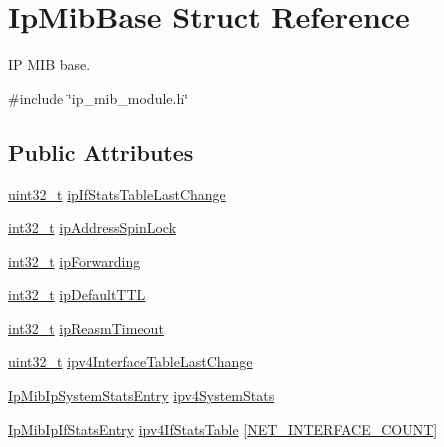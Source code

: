 \hypertarget{structIpMibBase}{}\section{Ip\+Mib\+Base Struct Reference}
\label{structIpMibBase}


IP M\+IB base.  




{\ttfamily \#include \char`\"{}ip\+\_\+mib\+\_\+module.\+h\char`\"{}}

\subsection*{Public Attributes}
\begin{DoxyCompactItemize}
\item 
\hyperlink{stdint_8h_a435d1572bf3f880d55459d9805097f62}{uint32\+\_\+t} \hyperlink{structIpMibBase_a8cdd6b8806367452ed88c4ff7fddc8fe}{ip\+If\+Stats\+Table\+Last\+Change}
\item 
\hyperlink{stdint_8h_ab1967d8591af1a4e48c37fd2b0f184d0}{int32\+\_\+t} \hyperlink{structIpMibBase_a9e5af99b95d976bdc15b274de5699dcf}{ip\+Address\+Spin\+Lock}
\item 
\hyperlink{stdint_8h_ab1967d8591af1a4e48c37fd2b0f184d0}{int32\+\_\+t} \hyperlink{structIpMibBase_adcaa825f157134afdd9a9786a681321d}{ip\+Forwarding}
\item 
\hyperlink{stdint_8h_ab1967d8591af1a4e48c37fd2b0f184d0}{int32\+\_\+t} \hyperlink{structIpMibBase_a6907839b2109d1d70c3b71b1b5a31c65}{ip\+Default\+T\+TL}
\item 
\hyperlink{stdint_8h_ab1967d8591af1a4e48c37fd2b0f184d0}{int32\+\_\+t} \hyperlink{structIpMibBase_a99ed70a6bde37e1735a2b000886ada16}{ip\+Reasm\+Timeout}
\item 
\hyperlink{stdint_8h_a435d1572bf3f880d55459d9805097f62}{uint32\+\_\+t} \hyperlink{structIpMibBase_a3d40069243af37f8246adb927d33dbdd}{ipv4\+Interface\+Table\+Last\+Change}
\item 
\hyperlink{structIpMibIpSystemStatsEntry}{Ip\+Mib\+Ip\+System\+Stats\+Entry} \hyperlink{structIpMibBase_aba331a91325ca8ad19421914790ec778}{ipv4\+System\+Stats}
\item 
\hyperlink{structIpMibIpIfStatsEntry}{Ip\+Mib\+Ip\+If\+Stats\+Entry} \hyperlink{structIpMibBase_ac645b5ee1034d3b3a91c8e8ce6321f3e}{ipv4\+If\+Stats\+Table} \mbox{[}\hyperlink{net__config_8h_a116f850ebcb023ffa3e6b8de10c5cb35}{N\+E\+T\+\_\+\+I\+N\+T\+E\+R\+F\+A\+C\+E\+\_\+\+C\+O\+U\+NT}\mbox{]}
\item 

\end{DoxyCompactItemize}
